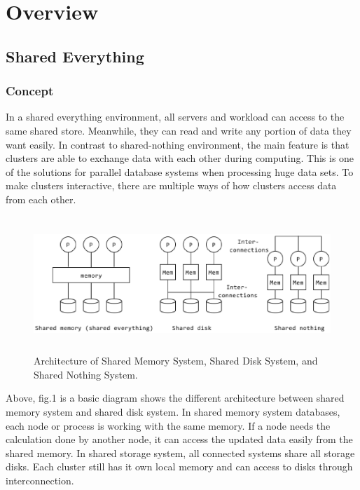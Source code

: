 \documentclass[onecolumn, draftclsnofoot,10pt, compsoc]{IEEEtran}
\begin{document}
\section{Overview}
\subsection{Shared Everything}

\subsubsection{Concept}
In a shared everything environment, all servers and workload can access to the same shared store.
Meanwhile, they can read and write any portion of data they want easily.
In contrast to shared-nothing environment, the main feature is that clusters are able to exchange data with each other during computing.
This is one of the solutions for parallel database systems when processing huge data sets. 
To make clusters interactive, there are multiple ways of how clusters access data from each other.

\begin{figure}[ht]
    \begin{center}
    \includegraphics[height=2in, keepaspectratio]{amyImage1.eps}
    \caption{Architecture of Shared Memory System, Shared Disk System, and Shared Nothing System.}
    \end{center}
\end{figure}

Above, fig.1 is a basic diagram shows the different architecture between shared memory system and shared disk system. 
In shared memory system databases, each node or process is working with the same memory. 
If a node needs the calculation done by another node, it can access the updated data easily from the shared memory. 
In shared storage system, all connected systems share all storage disks. 
Each cluster still has it own local memory and can access to disks through interconnection.
\end{document}
